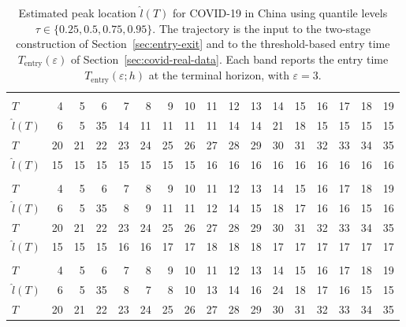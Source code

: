 \documentclass[12pt,a4paper]{article}
\begin{document}
\begin{table}
	\caption{Estimated peak location $\hat{l}(T)$ for COVID-19 in China using quantile levels $\tau\in\{0.25,0.5,0.75,0.95\}$. The trajectory is the input to the two-stage construction of Section~\ref{sec:entry-exit} and to the threshold-based entry time $T_{\mathrm{entry}}(\varepsilon)$ of Section~\ref{sec:covid-real-data}. Each band reports the entry time $T_{\mathrm{entry}}(\varepsilon;h)$ at the terminal horizon, with $\varepsilon=3$.}
	\label{tab:china_tau}
	\begin{tabular*}{\textheight}{@{\extracolsep{\fill}}lrrrrrrrrrrrrrrrr}
		\toprule
		\addlinespace[2.5pt]
		\multicolumn{17}{c}{\textbf{$\tau=0.25,\ T_{\mathrm{entry}}(3)=15$}} \\
		\addlinespace[2.5pt]
		\midrule
		$T$ & 4 & 5 & 6 & 7 & 8 & 9 & 10 & 11 & 12 & 13 & 14 & 15 & 16 & 17 & 18 & 19 \\
		$\hat{l}(T)$ & 6 & 5 & 35 & 14 & 11 & 11 & 11 & 11 & 14 & 14 & 21 & 18 & 15 & 15 & 15 & 15 \\
		$T$ & 20 & 21 & 22 & 23 & 24 & 25 & 26 & 27 & 28 & 29 & 30 & 31 & 32 & 33 & 34 & 35 \\
		$\hat{l}(T)$ & 15 & 15 & 15 & 15 & 15 & 15 & 15 & 16 & 16 & 16 & 16 & 16 & 16 & 16 & 16 & 16 \\
		\midrule\addlinespace[2.5pt]
		\multicolumn{17}{c}{\textbf{$\tau=0.5,\ T_{\mathrm{entry}}(3)=13$}} \\
		\addlinespace[2.5pt]
		\midrule
		$T$ & 4 & 5 & 6 & 7 & 8 & 9 & 10 & 11 & 12 & 13 & 14 & 15 & 16 & 17 & 18 & 19 \\
		$\hat{l}(T)$ & 6 & 5 & 35 & 8 & 9 & 11 & 11 & 12 & 14 & 15 & 18 & 17 & 16 & 16 & 15 & 16 \\
		$T$ & 20 & 21 & 22 & 23 & 24 & 25 & 26 & 27 & 28 & 29 & 30 & 31 & 32 & 33 & 34 & 35 \\
		$\hat{l}(T)$ & 15 & 15 & 15 & 16 & 16 & 17 & 17 & 18 & 18 & 18 & 17 & 17 & 17 & 17 & 17 & 17 \\
		\midrule\addlinespace[2.5pt]
		\multicolumn{17}{c}{\textbf{$\tau=0.75,\ T_{\mathrm{entry}}(3)=23$}} \\
		\addlinespace[2.5pt]
		\midrule
		$T$ & 4 & 5 & 6 & 7 & 8 & 9 & 10 & 11 & 12 & 13 & 14 & 15 & 16 & 17 & 18 & 19 \\
		$\hat{l}(T)$ & 6 & 5 & 35 & 8 & 7 & 8 & 10 & 13 & 14 & 16 & 24 & 18 & 17 & 16 & 15 & 15 \\
		$T$ & 20 & 21 & 22 & 23 & 24 & 25 & 26 & 27 & 28 & 29 & 30 & 31 & 32 & 33 & 34 & 35 \\

\end{tabular*}
\end{table}
\end{document}
